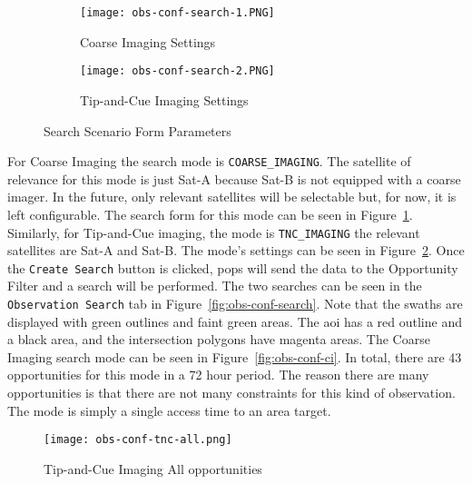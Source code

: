 \begin{figure}[h]
    \centering
    \begin{subfigure}[b]{0.49\textwidth}
	\centering
	\texttt{[image: obs-conf-search-1.PNG]} 
	\caption{Coarse Imaging Settings}
	\label{fig:obs-conf-search-1} 
    \end{subfigure}
    \hfill
    \begin{subfigure}[b]{0.49\textwidth}
	\centering
	\texttt{[image: obs-conf-search-2.PNG]} 
	\caption{Tip-and-Cue Imaging Settings}
	\label{fig:obs-conf-search-2} 
    \end{subfigure}
    \caption{Search Scenario Form Parameters}
    \label{fig:obs-conf-searches} 
\end{figure}


For Coarse Imaging the search mode is \texttt{COARSE\_IMAGING}.  The satellite
of relevance for this mode is just Sat-A because Sat-B is not equipped with a
coarse imager. In the future, only relevant satellites will be selectable but,
for now, it is left configurable.  The search form for this mode can be seen in
Figure~\ref{fig:obs-conf-search-1}. Similarly, for Tip-and-Cue imaging, the
mode is \texttt{TNC\_IMAGING} the relevant satellites are Sat-A and Sat-B.  The
mode's settings can be seen in Figure~\ref{fig:obs-conf-search-2}. Once the
\texttt{Create Search} button is clicked, \gls{pops} will send the data to the
Opportunity Filter and a search will be performed. The two searches can be seen
in the \texttt{Observation Search} tab in Figure~\ref{fig:obs-conf-search}.
Note that the swaths are displayed with green outlines and faint green areas.
The \gls{aoi} has a red outline and a black area, and the intersection polygons
have magenta areas. The Coarse Imaging search mode can be seen in
Figure~\ref{fig:obs-conf-ci}. In total, there are 43 opportunities for this
mode in a 72 hour period. The reason there are many opportunities is that there
are not many constraints for this kind of observation. The mode is simply a
single access time to an area target. 

\begin{figure}[ht]
    \centering
    \texttt{[image: obs-conf-tnc-all.png]} 
    \caption{Tip-and-Cue Imaging All opportunities}
    \label{fig:obs-conf-tnc-all} 
\end{figure}

